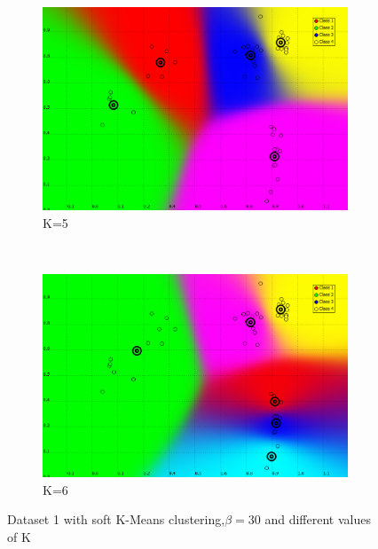 \documentclass[a4paper,10pt]{article}
\begin{document}
\begin{figure}[H]
\begin{subfigure}[t]{0.2\textwidth}
     \end{subfigure}
      ~
    \begin{subfigure}[t]{0.2\textwidth}
      \centering
      \includegraphics[width=\textwidth]{pictures/dataset_1_soft-Kmeans-5K-beta30}
      \caption{K=5}
      \label{fig:dataset_1_soft-Kmeans-5K-beta30}
     \end{subfigure}
      ~
    \begin{subfigure}[t]{0.2\textwidth}
      \centering
      \includegraphics[width=\textwidth]{pictures/dataset_1_soft-Kmeans-6K-beta30}
      \caption{K=6}
      \label{fig:dataset_1_soft-Kmeans-6K-beta30}
     \end{subfigure}
     \caption{Dataset 1 with soft K-Means clustering,$\beta = 30$ and different values of K}
     \label{fig:soft_kmeans_varyk}
\end{figure}
\end{document}
